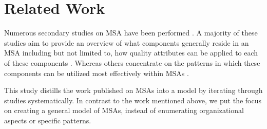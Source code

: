 \section{Related Work}
\label{sec:related_work}

Numerous secondary studies on MSA have been performed \cite{Garriga2018203,Alshuqayran201644,Pahl2016137,Soldani2018215,Taibi2018221,DiFrancesco201977,Hamzehloui20191079}. A majority of these studies aim to provide an overview of what components generally reside in an MSA including but not limited to, how quality attributes \cite{o2007quality} can be applied to each of these components \cite{Garriga2018203, Alshuqayran201644, Pahl2016137}. Whereas others concentrate on the patterns in which these components can be utilized most effectively within MSAs \cite{Taibi2018221,richardson2018microservices, Akbulut201919,IBMBook,Messina2016223,5-newman2021building}.

This study distills the work published on MSAs into a model by iterating through studies systematically. In contrast to the work mentioned above, we put the focus on creating a general model of MSAs, instead of enumerating organizational aspects or specific patterns.


